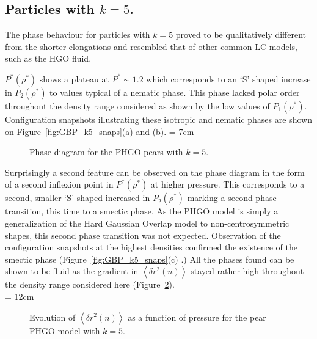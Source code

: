 \subsection{Particles with $k=5$.}

The phase behaviour for particles with $k=5$ proved to be qualitatively different from the shorter
elongations and resembled that of other common LC models, such as the HGO fluid.

$P^{*}(\rho^{*})$ shows a plateau at $P^{*}\sim 1.2$ which corresponds to an `S' shaped increase in 
$P_2(\rho^{*})$ to values typical of a nematic
phase. This phase lacked polar order throughout the density range
considered as shown by the low values  of $P_1(\rho^{*})$. Configuration snapshots illustrating 
these isotropic and nematic phases are shown on Figure~\ref{fig:GBP_k5_snaps}(a) and (b).
%
%
\picW = 7cm
\begin{figure}
	\caption{Phase diagram for the PHGO pears with $k=5$.}
	\label{fig:PHGO_phaseDia_k5}
\end{figure}
%
%
Surprisingly a second feature can be observed on the phase diagram in the form of a second inflexion
point in $P^{*}(\rho^{*})$ at higher pressure. This corresponds to a second, smaller `S' shaped
increased in $P_2(\rho^{*})$ marking a second phase transition, this time to a smectic phase.
As the PHGO model is simply a generalization of the Hard Gaussian Overlap model to 
non-centrosymmetric shapes, this second phase transition was not expected. Observation of the 
configuration snapshots at the highest densities confirmed the existence of the smectic phase 
(\eg Figure~\ref{fig:GBP_k5_snaps}(c) .)
All the phases found can be shown to be fluid as the gradient in $\left< \delta r^2(n) \right>$
stayed rather high throughout the density range considered here (Figure~\ref{fig:GBP_k5_dc}).\\

\picW = 12cm
\begin{figure}
	\centering
	\caption{Evolution of $\left< \delta r^2(n) \right>$ as a function of pressure for the
	pear PHGO model with $k=5$.}
	\label{fig:GBP_k5_dc}
\end{figure}


